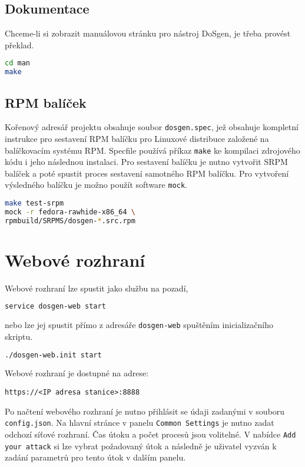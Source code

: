 \subsection{Dokumentace}
Chceme-li si zobrazit manuálovou stránku pro nástroj DoSgen, je třeba provést překlad.
\begin{lstlisting}[language=bash]
cd man
make
\end{lstlisting}

\subsection{RPM balíček}
Kořenový adresář projektu obsahuje soubor \texttt{dosgen.spec}, jež obsahuje kompletní instrukce pro sestavení RPM balíčku pro Linuxové distribuce založené na balíčkovacím systému RPM. Specfile používá příkaz \texttt{make} ke kompilaci zdrojového kódu i jeho následnou instalaci. Pro sestavení balíčku je nutno vytvořit SRPM balíček a poté spustit proces sestavení samotného RPM balíčku. Pro vytvoření výsledného balíčku je možno použít software \texttt{mock}. 

\begin{lstlisting}[language=bash]
make test-srpm
mock -r fedora-rawhide-x86_64 \
rpmbuild/SRPMS/dosgen-*.src.rpm
\end{lstlisting}

\section{Webové rozhraní}
Webové rozhraní lze spustit jako službu na pozadí,

\begin{lstlisting}[language=bash]
service dosgen-web start
\end{lstlisting}

\noindent nebo lze jej spustit přímo z adresáře \texttt{dosgen-web} spuštěním inicializačního skriptu.

\begin{lstlisting}[language=bash]
./dosgen-web.init start
\end{lstlisting}
Webové rozhraní je dostupné na adrese:
\begin{lstlisting}
https://<IP adresa stanice>:8888
\end{lstlisting}

Po načtení webového rozhraní je nutno přihlásit se údaji zadanými v souboru \texttt{config.json}. Na hlavní stránce v panelu \texttt{Common Settings} je nutno zadat odchozí síťové rozhraní. Čas útoku a počet procesů jsou volitelné. V nabídce \texttt{Add your attack} si lze vybrat požadovaný útok a následně je uživatel vyzván k zadání parametrů pro tento útok v dalším panelu.

